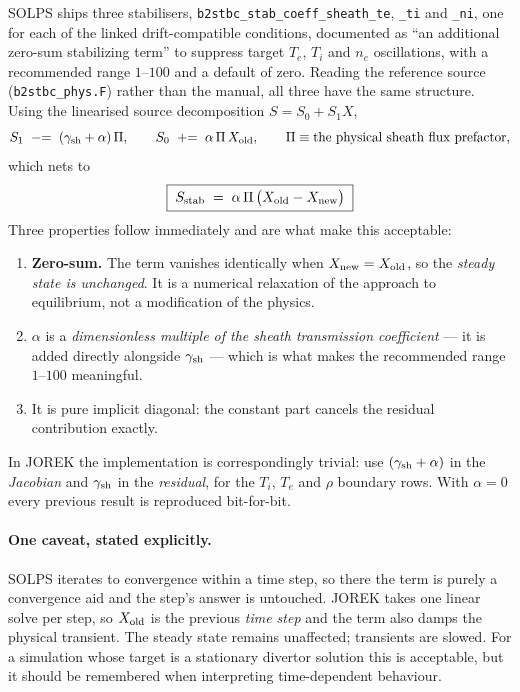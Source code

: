 \documentclass[11pt,a4paper]{article}
\newcommand{\code}[1]{\texttt{\small #1}}
\begin{document}
SOLPS ships three stabilisers, \code{b2stbc\_stab\_coeff\_sheath\_te}, \code{\_ti} and \code{\_ni},
one for each of the linked drift-compatible conditions, documented as ``an additional zero-sum
stabilizing term'' to suppress target $T_e$, $T_i$ and $n_e$ oscillations, with a recommended range
$1$--$100$ and a default of zero. Reading the reference source (\code{b2stbc\_phys.F}) rather than
the manual, all three have the same structure. Using the linearised source decomposition
$S = S_0 + S_1 X$,
\begin{equation}
S_1 \;\mathrel{-}=\; (\gamma_{\rm sh}+\alpha)\,\Pi,
\qquad
S_0 \;\mathrel{+}=\; \alpha\,\Pi\,X_{\rm old},
\qquad
\Pi \equiv \text{the physical sheath flux prefactor},
\end{equation}
which nets to
\begin{equation}
\boxed{\;S_{\rm stab} \;=\; \alpha\,\Pi\,\big(X_{\rm old}-X_{\rm new}\big)\;}
\label{eq:stab}
\end{equation}
Three properties follow immediately and are what make this acceptable:
\begin{enumerate}\itemsep2pt
\item \textbf{Zero-sum.} The term vanishes identically when $X_{\rm new}=X_{\rm old}$, so the
\emph{steady state is unchanged}. It is a numerical relaxation of the approach to equilibrium, not
a modification of the physics.
\item $\alpha$ is a \emph{dimensionless multiple of the sheath transmission coefficient} --- it is
added directly alongside $\gamma_{\rm sh}$ --- which is what makes the recommended range $1$--$100$
meaningful.
\item It is pure implicit diagonal: the constant part cancels the residual contribution exactly.
\end{enumerate}
In JOREK the implementation is correspondingly trivial: use $(\gamma_{\rm sh}+\alpha)$ in the
\emph{Jacobian} and $\gamma_{\rm sh}$ in the \emph{residual}, for the $T_i$, $T_e$ and $\rho$
boundary rows. With $\alpha=0$ every previous result is reproduced bit-for-bit.

\paragraph{One caveat, stated explicitly.} SOLPS iterates to convergence within a time step, so
there the term is purely a convergence aid and the step's answer is untouched. JOREK takes one
linear solve per step, so $X_{\rm old}$ is the previous \emph{time step} and the term also damps
the physical transient. The steady state remains unaffected; transients are slowed. For a
simulation whose target is a stationary divertor solution this is acceptable, but it should be
remembered when interpreting time-dependent behaviour.
\end{document}
